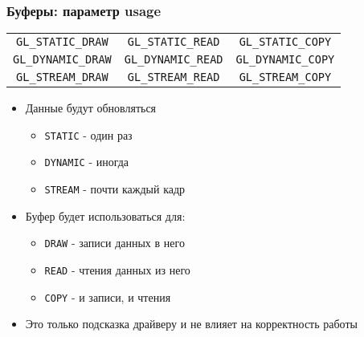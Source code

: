 \documentclass{beamer}
\begin{document}
\begin{frame}[fragile]
\frametitle{Буферы: параметр usage}
\begin{table}
\centering
\begin{tabular}{ c c c }
 \verb|GL_STATIC_DRAW| & \verb|GL_STATIC_READ| & \verb|GL_STATIC_COPY| \\ 
 \verb|GL_DYNAMIC_DRAW| & \verb|GL_DYNAMIC_READ| & \verb|GL_DYNAMIC_COPY| \\
 \verb|GL_STREAM_DRAW| & \verb|GL_STREAM_READ| & \verb|GL_STREAM_COPY|
\end{tabular}
\end{table}
\pause
\begin{itemize}
\item Данные будут обновляться
\begin{itemize}
\item \verb|STATIC| - один раз
\item \verb|DYNAMIC| - иногда
\item \verb|STREAM| - почти каждый кадр
\end{itemize}
\pause
\item Буфер будет использоваться для:
\begin{itemize}
\item \verb|DRAW| - записи данных в него
\item \verb|READ| - чтения данных из него
\item \verb|COPY| - и записи, и чтения
\end{itemize}
\pause
\item Это только подсказка драйверу и не влияет на корректность работы
\end{itemize}
\end{frame}
\end{document}

